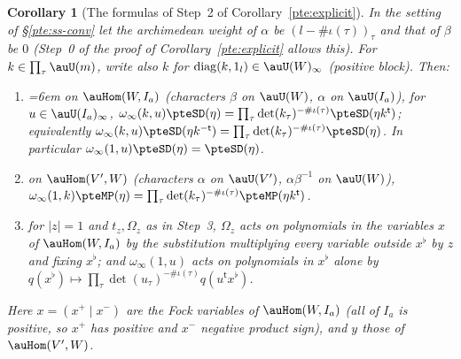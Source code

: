 \documentclass[10pt]{amsart}
\newtheorem{corollary}[theorem]{Corollary}
\theoremstyle{definition}
\theoremstyle{remark}
\begin{document}
\begin{corollary}[The formulas of Step~2 of Corollary~\ref{pte:explicit}]\label{ptf:SDlaw}
In the setting of \S\ref{pte:ss-conv} let the archimedean weight of $\alpha$ be $(l-\#\iota(\tau))_\tau$ and
that of $\beta$ be $0$ (Step~0 of the proof of Corollary~\ref{pte:explicit} allows this). For
$k\in\prod_\tau\auU(m)$, write also $k$ for $\mathrm{diag}(k,1_l)\in\auU(W)_\infty$ (positive block). Then:
\begin{enumerate}
\item[(a)] {\emergencystretch=6em on $\auHom(W,I_a)$ (characters $\beta$ on $\auU(W)$, $\alpha$ on $\auU(I_a)$), for $u\in\auU(I_a)_\infty$,
$\omega_\infty(k,u)\pteSD(\eta)=\allowbreak \prod_\tau\det(k_\tau)^{-\#\iota(\tau)}\pteSD(\eta k^{\mathsf t})$; equivalently
$\omega_\infty(k,u)\pteSD(\eta k^{-\mathsf t})=\prod_\tau\det(k_\tau)^{-\#\iota(\tau)}\pteSD(\eta)$. In particular
$\omega_\infty(1,u)\pteSD(\eta)=\pteSD(\eta)$.\par}
\item[(b)] on $\auHom(V',W)$ (characters $\alpha$ on $\auU(V')$, $\alpha\beta^{-1}$ on $\auU(W)$),
$\omega_\infty(1,k)\pteMP(\eta)=\prod_\tau\det(k_\tau)^{-\#\iota(\tau)}\pteMP(\eta k^{\mathsf t})$.
\item[(c)] for $|z|=1$ and $t_z,\Omega_z$ as in Step~3, $\Omega_z$ acts on polynomials in the variables
$x$ of $\auHom(W,I_a)$ by the substitution multiplying every variable outside $x^\flat$ by $z$ and fixing
$x^\flat$; and $\omega_\infty(1,u)$ acts on polynomials in $x^\flat$ alone by $q(x^\flat)\mapsto\prod_\tau
\det(u_\tau)^{-\#\iota(\tau)}q(u^{\mathsf t}x^\flat)$.
\end{enumerate}
Here $x=(x^+\mid x^-)$ are the Fock variables of $\auHom(W,I_a)$ (all of $I_a$ is positive, so $x^+$ has
positive and $x^-$ negative product sign), and $y$ those of $\auHom(V',W)$.
\end{corollary}
\end{document}
